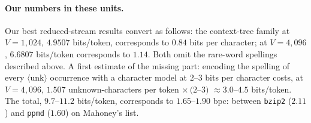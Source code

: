 \documentclass[11pt]{article}
\begin{document}
\paragraph{Our numbers in these units.}
Our best reduced-stream results convert as follows: the context-tree
family at $V=1{,}024$, $4.9507$ bits/token, corresponds to $0.84$
bits per character; at $V=4{,}096$, $6.6807$ bits/token corresponds
to $1.14$.  Both omit the rare-word spellings described above.  A
first estimate of the missing part: encoding the spelling of every
$\langle\mathrm{unk}\rangle$ occurrence with a character model at
$2$--$3$ bits per character costs, at $V=4{,}096$, $1.507$
unknown-characters per token $\times\, (2$--$3)$ $\approx 3.0$--$4.5$
bits/token.  The total, $9.7$--$11.2$ bits/token, corresponds to
$1.65$--$1.90$ bpc: between \texttt{bzip2} ($2.11$) and \texttt{ppmd}
($1.60$) on Mahoney's list.
\end{document}
